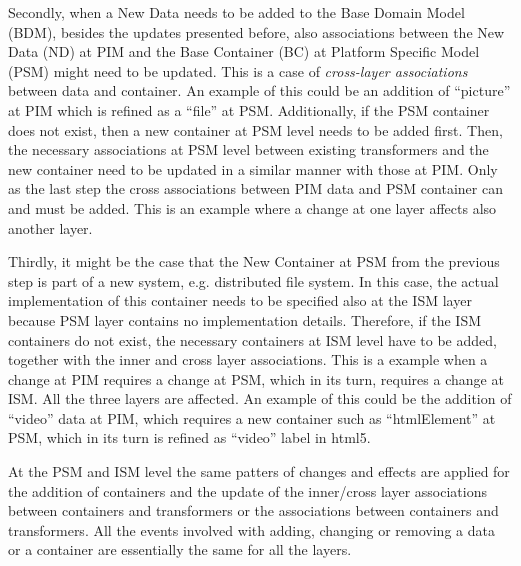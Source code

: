 \documentclass{sig-alternate}
\begin{document}
Secondly, when a New Data needs to be added to the Base Domain Model (BDM),
besides the updates presented before, also associations between the New Data (ND) at PIM and the Base Container (BC) at Platform Specific Model (PSM) might need to be updated.
This is a case of \textit{cross-layer associations} between data and container.
An example of this could be an addition of ``picture'' at PIM which is refined as a ``file'' at PSM.
Additionally, if the PSM container does not exist, then a new container at PSM level needs to be added first.
Then, the necessary associations at PSM level between existing transformers and the new container need to be updated in a similar manner with those at PIM.
Only as the last step the cross associations between PIM data and PSM container can and must be added.
This is an example where a change at one layer affects also another layer.

Thirdly, it might be the case that the New Container at PSM from the previous step is part of a new system, e.g. distributed file system.
In this case, the actual implementation of this container needs to be specified also at the ISM layer because PSM layer contains no implementation details.
Therefore, if the ISM containers do not exist, the necessary containers at ISM level have to be added,
together with the inner and cross layer associations. 
This is a example when a change at PIM requires a change at PSM, which in its turn, requires a change at ISM.
All the three layers are affected. 
An example of this could be the addition of ``video'' data at PIM, 
which requires a new container such as ``htmlElement'' at PSM,
which in its turn is refined as ``video'' label in html5.

At the PSM and ISM level the same patters of changes and effects are applied for the addition of containers
and the update of the inner/cross layer associations between containers and transformers
or the associations between containers and transformers.
All the events involved with adding, changing or removing a data or a container are essentially the same for all the layers.
\end{document}
